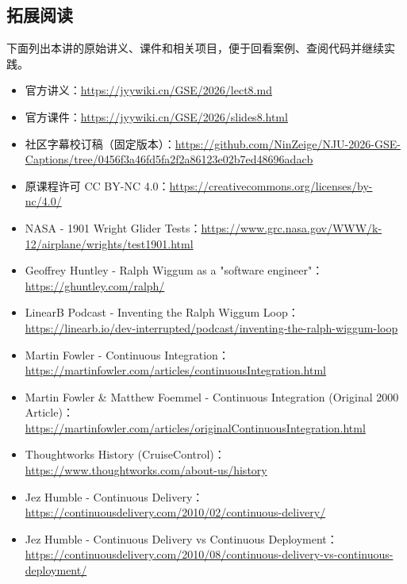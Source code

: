\documentclass[UTF8,a4paper,11pt,fontset=fandol]{ctexart}
\begin{document}
\subsection{拓展阅读}

下面列出本讲的原始讲义、课件和相关项目，便于回看案例、查阅代码并继续实践。

\begin{itemize}

\item 官方讲义：\url{https://jyywiki.cn/GSE/2026/lect8.md}

\item 官方课件：\url{https://jyywiki.cn/GSE/2026/slides8.html}

\item 社区字幕校订稿（固定版本）：\url{https://github.com/NinZeige/NJU-2026-GSE-Captions/tree/0456f3a46fd5fa2f2a86123e02b7ed48696adacb}

\item 原课程许可 CC BY-NC 4.0：\url{https://creativecommons.org/licenses/by-nc/4.0/}

\item NASA - 1901 Wright Glider Tests：\url{https://www.grc.nasa.gov/WWW/k-12/airplane/wrights/test1901.html}

\item Geoffrey Huntley - Ralph Wiggum as a "software engineer"：\url{https://ghuntley.com/ralph/}

\item LinearB Podcast - Inventing the Ralph Wiggum Loop：\url{https://linearb.io/dev-interrupted/podcast/inventing-the-ralph-wiggum-loop}

\item Martin Fowler - Continuous Integration：\url{https://martinfowler.com/articles/continuousIntegration.html}

\item Martin Fowler \& Matthew Foemmel - Continuous Integration (Original 2000 Article)：\url{https://martinfowler.com/articles/originalContinuousIntegration.html}

\item Thoughtworks History (CruiseControl)：\url{https://www.thoughtworks.com/about-us/history}

\item Jez Humble - Continuous Delivery：\url{https://continuousdelivery.com/2010/02/continuous-delivery/}

\item Jez Humble - Continuous Delivery vs Continuous Deployment：\url{https://continuousdelivery.com/2010/08/continuous-delivery-vs-continuous-deployment/}


\end{itemize}
\end{document}
